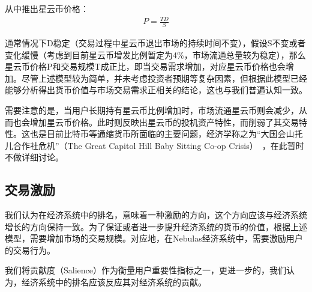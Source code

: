 从中推出星云币价格：
\begin{align}
P=\frac{TD}{S}
\end{align}

通常情况下D稳定（交易过程中星云币退出市场的持续时间不变），假设S不变或者变化缓慢（考虑到目前星云币增发比例暂定为4\%，市场流通总量较为稳定），那么星云币价格P和交易规模T成正比，即当交易需求增加，对应星云币价格也会增加。尽管上述模型较为简单，并未考虑投资者预期等复杂因素，但根据此模型已经能够分析得出货币价值与市场交易需求正相关的结论，这也与我们普遍认知一致。

需要注意的是，当用户长期持有星云币比例增加时，市场流通星云币则会减少，从而也会增加星云币价格。此时则反映出星云币的投机资产特性，而削弱了其交易特性。这也是目前比特币等通缩货币所面临的主要问题，经济学称之为“大国会山托儿合作社危机”（The Great Capitol Hill Baby Sitting Co-op Crisis）~\cite{hens2007great}，在此暂时不做详细讨论。

\subsection{交易激励}

我们认为在经济系统中的排名，意味着一种激励的方向，这个方向应该与经济系统增长的方向保持一致。为了保证或者进一步提升经济系统的货币的价值，根据上述模型，需要增加市场的交易规模。对应地，在Nebulas经济系统中，需要激励用户的交易行为。

我们将贡献度（Salience）作为衡量用户重要性指标之一，更进一步的，我们认为，经济系统中的排名应该反应其对经济系统的贡献。

